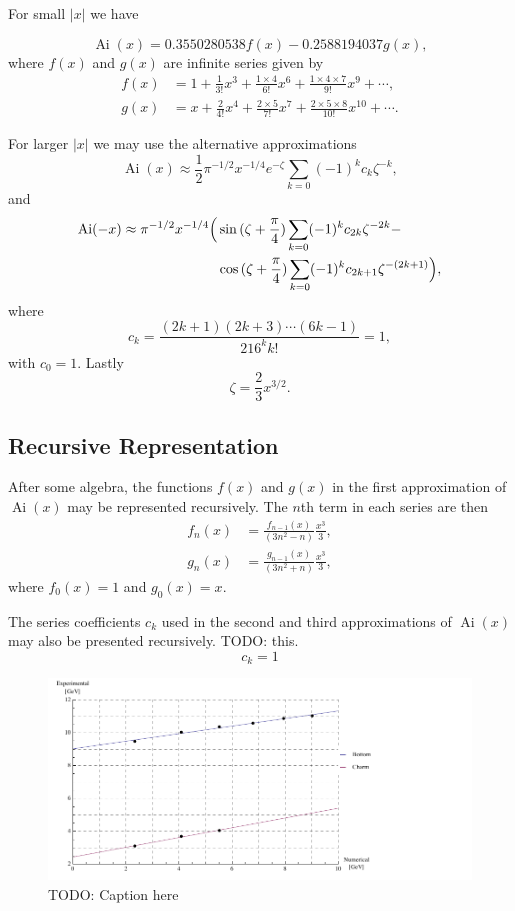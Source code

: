 \documentclass[]{article}
\renewcommand{\mod}[1]{\ensuremath{\lvert {#1} \rvert}}
\newcommand{\Ai}[1]{\ensuremath{\operatorname{Ai}({#1})}}
\begin{document}
For small $\mod{x}$ we have

\[\Ai{x} = 0.3550280538f(x) - 0.2588194037g(x),\]
where $f(x)$ and $g(x)$ are infinite series given by
\begin{align}
f(x) &= 1 + \frac{1}{3!}x^{3} + \frac{1\times4}{6!}x^{6} + \frac{1\times4\times{7}}{9!}x^{9} + \dotsb,\label{eqn:airyfirstf}\\
g(x) &= x + \frac{2}{4!}x^{4} + \frac{2\times5}{7!}x^{7} + \frac{2\times5\times{8}}{10!}x^{10} + \dotsb\label{eqn:airyfirstg}.
\end{align}

For larger $\mod{x}$ we may use the alternative approximations
\[
\Ai{x} \approx \frac{1}{2}\pi^{-1/2}x^{-1/4}e^{-\zeta} \sum\limits_{k=0} (-1)^{k}c_{k}\zeta^{-k},
\]
and
\[
	\begin{split}
		\Ai{-x} \approx \pi^{-1/2}x^{-1/4}
		\Bigl(
			&\sin{(\zeta + \frac{\pi}{4})}\sum\limits_{k=0}(-1)^{k}c_{2k}\zeta^{-2k} -\\
			&\cos{(\zeta + \frac{\pi}{4})}\sum\limits_{k=0}(-1)^{k}c_{2k+1}\zeta^{-(2k+1)}
		\Bigr),
	\end{split}
\]
where
\begin{equation}\label{eqn:ck}
c_{k} = \frac{(2k+1)(2k+3)\dotsb(6k-1)}{216^{k}k!} = 1,
\end{equation}
with $c_{0} = 1$. Lastly
\[
\zeta = \frac{2}{3}x^{3/2}.
\]

\subsection{Recursive Representation}\label{app:recursion}

After some algebra, the functions $f(x)$ and $g(x)$ in the first approximation of $\Ai{x}$ may be represented recursively. The $n$th term in each series are then
\begin{align*}
f_{n}(x) &= \frac{f_{n-1}(x)}{(3n^{2} - n)} \frac{x^{3}}{3},\\ 
g_{n}(x) &= \frac{g_{n-1}(x)}{(3n^{2} + n)} \frac{x^{3}}{3},
\end{align*}
where $f_{0}(x) = 1$ and $g_{0}(x) = x$.

The series coefficients $c_{k}$ used in the second and third approximations of $\Ai{x}$ may also be presented recursively. TODO: this.
\[
c_{k} = 1
\]

\begin{figure}[H]
	\hspace*{-0.15\textwidth}
	\centering
	\includegraphics[scale=1.3]{experimental-numerical}
	\caption{TODO: Caption here}
	\label{fig:data}
\end{figure}
\end{document}
